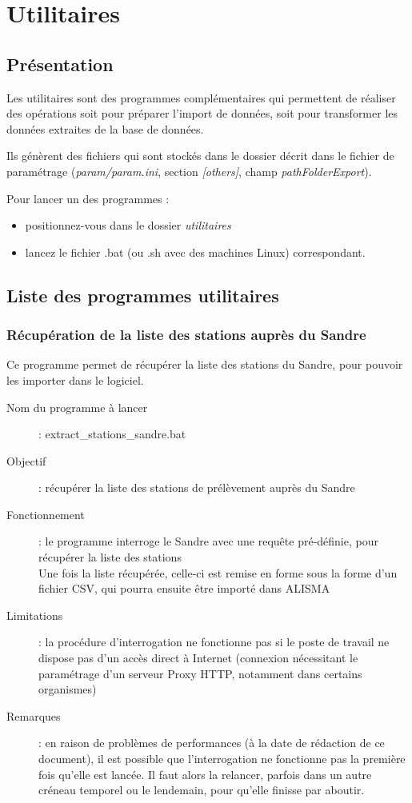 \chapter{Utilitaires}

\section{Présentation}
Les utilitaires sont des programmes complémentaires qui permettent de réaliser des opérations soit pour préparer l'import de données, soit pour transformer les données extraites de la base de données.

Ils génèrent des fichiers qui sont stockés dans le dossier décrit dans le fichier de paramétrage (\textit{param/param.ini}, section \textit{[others]}, champ \textit{pathFolderExport}).

Pour lancer un des programmes :
\begin{itemize}
\item positionnez-vous dans le dossier \textit{utilitaires}
\item lancez le fichier .bat (ou .sh avec des machines Linux) correspondant.
\end{itemize}

\section{Liste des programmes utilitaires}
\subsection{Récupération de la liste des stations auprès du Sandre}
\label{sandre}
Ce programme permet de récupérer la liste des stations du Sandre, pour pouvoir les importer dans le logiciel.

\begin{description}
\item [Nom du programme à lancer] : {extract\_stations\_sandre.bat}
\item [Objectif] : récupérer la liste des stations de prélèvement auprès du Sandre
\item [Fonctionnement] : le programme interroge le Sandre avec une requête pré-définie, pour récupérer la liste des stations\\
Une fois la liste récupérée, celle-ci est remise en forme sous la forme d'un fichier CSV, qui pourra ensuite être importé dans ALISMA
\item [Limitations] : la procédure d'interrogation ne fonctionne pas si le poste de travail ne dispose pas d'un accès direct à Internet (connexion nécessitant le paramétrage d'un serveur Proxy HTTP, notamment dans certains organismes)
\item [Remarques] : en raison de problèmes de performances (à la date de rédaction de ce document), il est possible que l'interrogation ne fonctionne pas la première fois qu'elle est lancée. Il faut alors la relancer, parfois dans un autre créneau temporel ou le lendemain, pour qu'elle finisse par aboutir.
\end{description}


